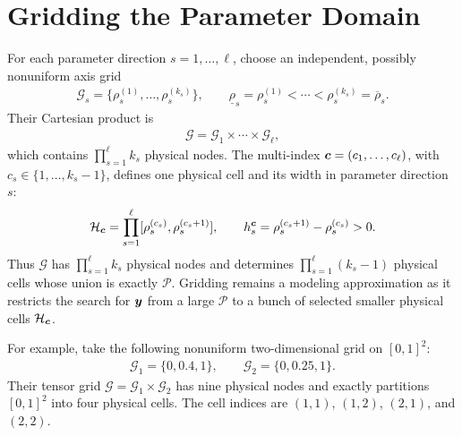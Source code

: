 \section[Gridding the Parameter Domain]{Gridding the Parameter Domain}
\label{sec:intro-gridding}

For each parameter direction $s=1,\ldots,\ell$, choose an independent, possibly nonuniform axis grid
\begin{gather*}
    \mathcal G_s=\{\rho_s^{(1)},\ldots,\rho_s^{(k_s)}\},
    \qquad
    \underline\rho_s=\rho_s^{(1)}<\cdots<\rho_s^{(k_s)}=\overline\rho_s.
\end{gather*}
Their Cartesian product is
\begin{gather*}
    \mathcal G=\mathcal G_1\times\cdots\times\mathcal G_\ell,
\end{gather*}
which contains $\prod_{s=1}^{\ell}k_s$ physical nodes. The multi-index $\boldsymbol{c}=(c_1,\ldots,c_\ell)$, with $c_s\in\{1,\ldots,k_s-1\}$, defines one physical cell and its width in parameter direction $s$:
\begin{gather*}
    \mathcal H_{\boldsymbol{c}}
    =\prod_{s=1}^{\ell}
    [\rho_s^{(c_s)},\rho_s^{(c_s+1)}],
    \qquad
    h_s^{\boldsymbol{c}}
    =\rho_s^{(c_s+1)}-\rho_s^{(c_s)}>0.
\end{gather*}
Thus $\mathcal G$ has $\prod_{s=1}^{\ell} k_s$ physical nodes and determines $\prod_{s=1}^{\ell}(k_s-1)$ physical cells whose union is exactly $\mathcal P$. Gridding remains a modeling approximation as it restricts the search for $\boldsymbol{y}$ from a large $\mathcal{P}$ to a bunch of selected smaller physical cells $\mathcal{H}_{\boldsymbol{c}}$.

For example, take the following nonuniform two-dimensional grid on $[0,1]^2$:
\begin{gather*}
    \mathcal G_1=\{0,0.4,1\},
    \qquad
    \mathcal G_2=\{0,0.25,1\}.
\end{gather*}
Their tensor grid $\mathcal G=\mathcal G_1\times\mathcal G_2$ has nine physical nodes and exactly partitions $[0,1]^2$ into four physical cells. The cell indices are $(1,1)$, $(1,2)$, $(2,1)$, and $(2,2)$.

